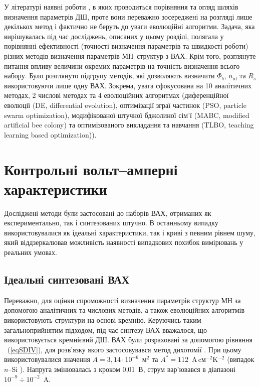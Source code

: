 У літературі наявні роботи \cite{Evangelou,Aubry,Kudryk}, в яких проводиться порівняння  та огляд шляхів визначення параметрів ДШ, проте вони переважно зосереджені на розгляді лише декількох метод і фактично не беруть до уваги еволюційні алгоритми.
Задача, яка вирішувалась під час досліджень, описаних у цьому розділі, полягала у порівнянні ефективності (точності визначення параметрів та швидкості роботи) різних методів визначення параметрів МН--структур з ВАХ.
Крім того, розглянуте питання впливу величини окремих параметрів на точність визначення всього набору.
Було розглянуто підгрупу методів, які дозволяють визначити $\Phi_b$, $n_\mathrm{id}$ та $R_s$ використовуючи лише одну ВАХ.
Зокрема, увага сфокусована на 10 аналітичних методах, 2 числові методах та 4 еволюційних алгоритмах
(диференційної еволюції (DE, differential evolution),
оптимізації зграї частинок (PSO, particle swarm optimization),
модифікованої штучної бджолиної сім'ї (MABC, modified artificial bee colony) та
оптимізованого викладання та навчання (TLBO, teaching learning based optimization)).



\section{Контрольні вольт--амперні характеристики}
Досліджені методи були застосовані до наборів ВАХ, отриманих як експериментально, так і синтезованих штучно.
В останньому випадку використовувалися як ідеальні характеристики, так і криві з певним рівнем шуму, який віддзеркалював можливість наявності випадкових похибок вимірювань у реальних умовах.

\subsection{Ідеальні синтезовані ВАХ\label{SubData}}
Переважно, для оцінки спроможності визначення параметрів структур МН за допомогою аналітичних \cite{Norde,Lien,Werner,Gromov,Lee,Bohlin,Cibils,Mikhelashvili,Kaminski} та числових \cite{Evangelou,Donoval} методів, а також еволюційних алгоритмів \cite{PSO_Ye,P-DE_Ishaque,TLBO_Patel} використовують структури на основі кремнію.
Керуючись таким загальноприйнятим підходом, під час синтезу ВАХ вважалося, що використовується кремнієвий ДШ.
ВАХ були розраховані за допомогою рівняння ~(\ref{eqSDIV}), для розв'язку якого застосовувався метод дихотомії \cite[с.~158]{KalitkinBook}.
При цьому використовувалися значення $A=3,14\cdot10^{-6}$~м$^2$ та $A^*=112$~A$\,$cм$^{-2}$K$^{-2}$ (випадок $n$--Si \cite{Schroder2006}).
Напруга змінювалась з кроком 0,01~В, струм вар'ювався в діапазоні $10^{-9}\div10^{-2}$~A.

